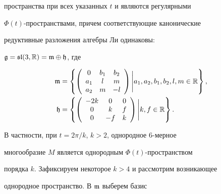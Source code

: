 пространства при всех указанных $t$ и являются регулярными


$\Phi(t)$-пространствами, причем соответствующие канонические


редуктивные разложения алгебры Ли одинаковы:


$\frak{g}=\frak{sl}(3,\Bbb{R})=\frak{m}\oplus\frak{h}$, где


\begin{align*}


\frak{m}&=\left\{\left(\begin{array}{ccc}


0 & b_1 & b_2 \\ a_1 & l & m \\ a_2 & m & -l


\end{array}\right)\Bigg|a_1,a_2,b_1,b_2,l,m\in\Bbb{R}\right\},\\


\frak{h}&=\left\{\left(\begin{array}{ccc}


-2k & 0 & 0 \\ 0 & k & f \\ 0 & -f & k


\end{array}\right)\Bigg|k,f\in\Bbb{R}\right\}.


\end{align*}


В частности, при $t=2\pi/k$, $k>2$, однородное $6$-мерное 


многообразие $M$ является однородным $\Phi(t)$-пространством


порядка $k$. Зафиксируем некоторое $k>4$ и рассмотрим возникающее


однородное пространство. В $\frak{m}$ выберем базис


